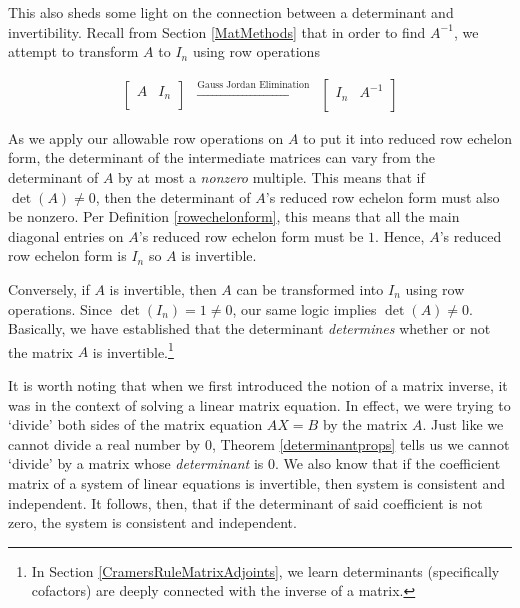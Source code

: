 \documentclass{ximera}
\begin{document}
This also sheds some light on the connection between a determinant and invertibility.  Recall from Section \ref{MatMethods} that in order to find $A^{-1}$, we attempt to transform $A$ to $I_{n}$ using row operations

\[ \begin{array}{ccc}

\left[ \begin{array}{c|c} A & I_{n} \\ \end{array} \right]

&
\xrightarrow{\text{Gauss Jordan Elimination}}

&

\left[ \begin{array}{c|c} I_{n} & A^{-1} \\ \end{array} \right] 

\end{array}\]

As we apply our allowable row operations on $A$ to put it into reduced row echelon form, the determinant of the intermediate matrices can vary from the determinant of $A$ by at most a \textit{nonzero} multiple.  This means that if $\det(A) \neq 0$, then the determinant of $A$'s reduced row echelon form must also be nonzero.   Per  Definition \ref{rowechelonform}, this  means that all the main diagonal entries on $A$'s reduced row echelon form must be $1$.  Hence,  $A$'s reduced row echelon form is $I_{n}$ so  $A$ is invertible. 

Conversely, if $A$ is invertible, then $A$ can be transformed into $I_{n}$ using row operations.  Since $\det\left(I_{n}\right) = 1 \neq 0$, our same logic implies $\det(A) \neq 0$. Basically, we have established that the determinant \textit{determines} whether or not the matrix $A$ is invertible.\footnote{In Section \ref{CramersRuleMatrixAdjoints}, we learn determinants (specifically cofactors) are deeply connected with the inverse of a matrix.}  

 

It is worth noting that when we first introduced the notion of a matrix inverse, it was in the context of solving a linear matrix equation.  In effect, we were trying to `divide' both sides of the matrix equation $AX = B$ by the matrix $A$.  Just like we cannot divide a real number by $0$, Theorem \ref{determinantprops} tells us we cannot `divide' by a matrix whose \textit{determinant} is $0$.  We also know that if the coefficient matrix of a system of linear equations is invertible, then system is consistent and independent.  It follows, then, that if the determinant of said coefficient is not zero, the system is consistent and independent.  
\end{document}
